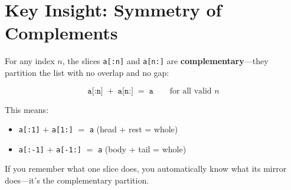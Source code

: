 \documentclass[11pt]{article}
\newcommand{\py}[1]{\texttt{\color{pyblue}#1}}
\begin{document}
\section{Key Insight: Symmetry of Complements}

For any index $n$, the slices \py{a[:n]} and \py{a[n:]} are \textbf{complementary}---they partition the list with no overlap and no gap:

\[
\texttt{a[:n]} \;+\; \texttt{a[n:]} \;=\; \texttt{a}
\qquad \text{for all valid } n
\]

This means:
\begin{itemize}[nosep]
  \item \py{a[:1]} $+$ \py{a[1:]} $=$ \py{a} \quad (head + rest = whole)
  \item \py{a[:-1]} $+$ \py{a[-1:]} $=$ \py{a} \quad (body + tail = whole)
\end{itemize}

\noindent
If you remember what one slice does, you automatically know what its mirror does---it's the complementary partition.
\end{document}
